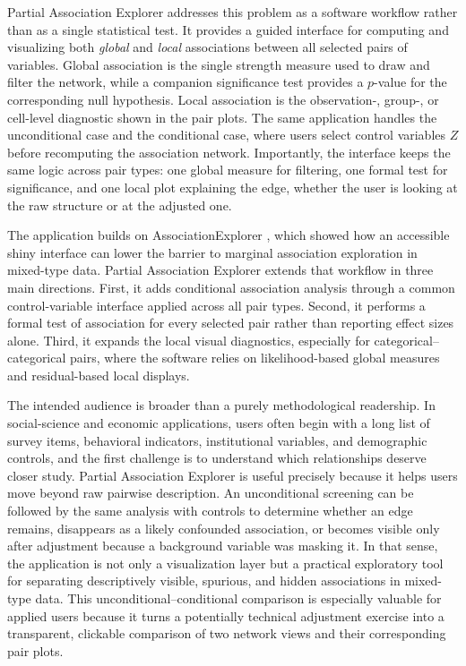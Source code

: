 \documentclass[11pt]{article}
\newcommand{\appname}{Partial Association Explorer}
\newcommand{\pkg}[1]{\textsf{#1}}
\begin{document}
\appname{} addresses this problem as a software workflow rather than as a
single statistical test. It provides a guided interface for computing and
visualizing both \emph{global} and \emph{local} associations between all
selected pairs of variables. Global association is the single strength measure
used to draw and filter the network, while a companion significance test
provides a $p$-value for the corresponding null hypothesis. Local association
is the observation-, group-, or cell-level diagnostic shown in the pair plots.
The same application handles the unconditional case and the conditional case,
where users select control variables $Z$ before recomputing the association
network. Importantly, the interface keeps the same logic across pair types: one
global measure for filtering, one formal test for significance, and one local
plot explaining the edge, whether the user is looking at the raw structure or
at the adjusted one.

The application builds on \pkg{AssociationExplorer}
\citep{SoeteweyHeuchenneClaesDescampe2026}, which showed how an accessible
\pkg{shiny} interface can lower the barrier to marginal association exploration
in mixed-type data. \appname{} extends that workflow in three main directions.
First, it adds conditional association analysis through a common control-variable
interface applied across all pair types. Second, it performs a formal test of
association for every selected pair rather than reporting effect sizes alone.
Third, it expands the local visual diagnostics, especially for
categorical--categorical pairs, where the software relies on likelihood-based
global measures and residual-based local displays.

The intended audience is broader than a purely methodological readership. In
social-science and economic applications, users often begin with a long list of
survey items, behavioral indicators, institutional variables, and demographic
controls, and the first challenge is to understand which relationships deserve
closer study. \appname{} is useful precisely because it helps users move beyond
raw pairwise description. An unconditional screening can be followed by the
same analysis with controls to determine whether an edge remains, disappears as
a likely confounded association, or becomes visible only after adjustment
because a background variable was masking it. In that sense, the application is
not only a visualization layer but a practical exploratory tool for separating
descriptively visible, spurious, and hidden associations in mixed-type data.
This unconditional--conditional comparison is especially valuable for applied
users because it turns a potentially technical adjustment exercise into a
transparent, clickable comparison of two network views and their corresponding
pair plots.
\end{document}

